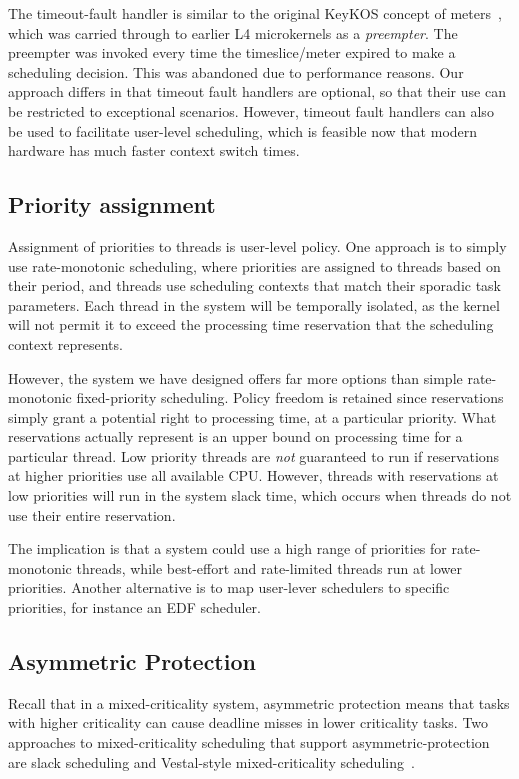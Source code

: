 The timeout-fault handler is similar to the original KeyKOS concept of
meters~\citep{Bomberger_FFHLS_92},
which was carried through to earlier L4 microkernels as a \emph{preempter}. The preempter was
invoked every time the timeslice/meter expired to make a scheduling decision. This was abandoned due
to performance reasons. Our approach differs in that timeout fault handlers are optional, so that
their use can be restricted to exceptional scenarios. However, timeout fault handlers can also be used to
facilitate user-level scheduling, which is feasible now that modern hardware has much faster context
switch times. 

\subsection{Priority assignment}

Assignment of priorities to threads is user-level policy. One approach is to simply use
rate-monotonic scheduling, where priorities are assigned to threads based on their period, and
threads use scheduling contexts that match their sporadic task parameters.  Each thread in the
system will be temporally isolated, as the kernel will not permit it to exceed the processing time
reservation that the scheduling context represents.

However, the system we have designed offers far more options than simple rate-monotonic fixed-priority
scheduling.  Policy freedom is retained since reservations simply grant a potential right to processing
time, at a particular priority.  What reservations actually represent is an upper bound on
processing time for a particular thread.  Low priority threads are \emph{not} guaranteed to run if
reservations at higher priorities use all available CPU.  However, threads with reservations at low
priorities will run in the system slack time, which occurs when threads do not use their entire
reservation.

The implication is that a system could use a high range of priorities for rate-monotonic threads,
while best-effort and rate-limited threads run at lower priorities.  Another alternative is to map
user-lever schedulers to specific  priorities, for instance an EDF scheduler. 

\subsection{Asymmetric Protection}

Recall that in a mixed-criticality system, asymmetric protection means that tasks with higher
criticality can cause deadline misses in lower criticality tasks.  Two approaches to 
mixed-criticality scheduling that support asymmetric-protection are slack scheduling and
Vestal-style mixed-criticality scheduling~\citep{Vestal_07,Burns_Davis_17}.

